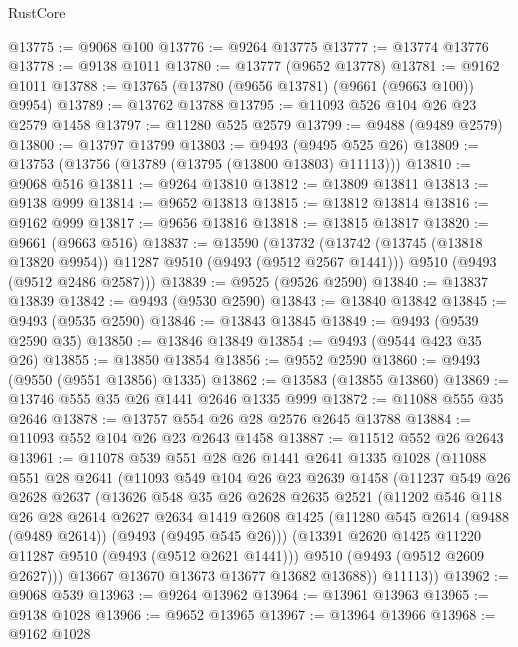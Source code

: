 \begin{lexlean}{RustCore}
\begin{coremodule}
@13775 := @9068 @100
@13776 := @9264 @13775
@13777 := @13774 @13776
@13778 := @9138 @1011
@13780 := @13777 (@9652 @13778)
@13781 := @9162 @1011
@13788 := @13765 (@13780 (@9656 @13781) (@9661 (@9663 @100)) @9954)
@13789 := @13762 @13788
@13795 := @11093 @526 @104 @26 @23 @2579 @1458
@13797 := @11280 @525 @2579
@13799 := @9488 (@9489 @2579)
@13800 := @13797 @13799
@13803 := @9493 (@9495 @525 @26)
@13809 := @13753 (@13756 (@13789 (@13795 (@13800 @13803) @11113)))
@13810 := @9068 @516
@13811 := @9264 @13810
@13812 := @13809 @13811
@13813 := @9138 @999
@13814 := @9652 @13813
@13815 := @13812 @13814
@13816 := @9162 @999
@13817 := @9656 @13816
@13818 := @13815 @13817
@13820 := @9661 (@9663 @516)
@13837 := @13590
    (@13732
      (@13742 (@13745 (@13818 @13820 @9954)) @11287 @9510 (@9493 (@9512 @2567 @1441)))
      @9510
      (@9493 (@9512 @2486 @2587)))
@13839 := @9525 (@9526 @2590)
@13840 := @13837 @13839
@13842 := @9493 (@9530 @2590)
@13843 := @13840 @13842
@13845 := @9493 (@9535 @2590)
@13846 := @13843 @13845
@13849 := @9493 (@9539 @2590 @35)
@13850 := @13846 @13849
@13854 := @9493 (@9544 @423 @35 @26)
@13855 := @13850 @13854
@13856 := @9552 @2590
@13860 := @9493 (@9550 (@9551 @13856) @1335)
@13862 := @13583 (@13855 @13860)
@13869 := @13746 @555 @35 @26 @1441 @2646 @1335 @999
@13872 := @11088 @555 @35 @2646
@13878 := @13757 @554 @26 @28 @2576 @2645 @13788
@13884 := @11093 @552 @104 @26 @23 @2643 @1458
@13887 := @11512 @552 @26 @2643
@13961 := @11078
    @539
    @551
    @28
    @26
    @1441
    @2641
    @1335
    @1028
    (@11088
      @551
      @28
      @2641
      (@11093
        @549
        @104
        @26
        @23
        @2639
        @1458
        (@11237
          @549
          @26
          @2628
          @2637
          (@13626
            @548
            @35
            @26
            @2628
            @2635
            @2521
            (@11202
              @546
              @118
              @26
              @28
              @2614
              @2627
              @2634
              @1419
              @2608
              @1425
              (@11280 @545 @2614 (@9488 (@9489 @2614)) (@9493 (@9495 @545 @26)))
              (@13391 @2620 @1425 @11220 @11287 @9510 (@9493 (@9512 @2621 @1441)))
              @9510
              (@9493 (@9512 @2609 @2627)))
            @13667
            @13670
            @13673
            @13677
            @13682
            @13688))
        @11113))
@13962 := @9068 @539
@13963 := @9264 @13962
@13964 := @13961 @13963
@13965 := @9138 @1028
@13966 := @9652 @13965
@13967 := @13964 @13966
@13968 := @9162 @1028

\end{coremodule}
\end{lexlean}
